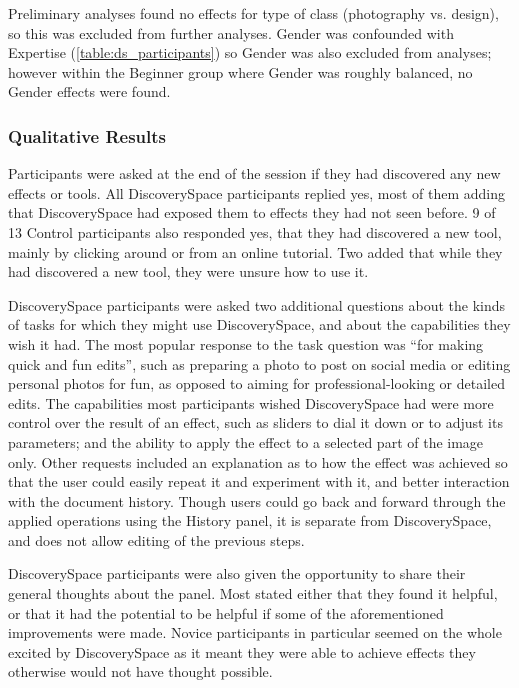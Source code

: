 Preliminary analyses found no effects for type of class (photography vs. design), so this was excluded from further analyses. Gender was confounded with Expertise (\autoref{table:ds_participants}) so Gender was also excluded from analyses; however within the Beginner group where Gender was roughly balanced, no Gender effects were found.

\subsubsection{Qualitative Results}
Participants were asked at the end of the session if they had discovered any new effects or tools. All Discovery\-Space participants replied yes, most of them adding that Discovery\-Space had exposed them to effects they had not seen before. 9 of 13 Control participants also responded yes, that they had discovered a new tool, mainly by clicking around or from an online tutorial. Two added that while they had discovered a new tool, they were unsure how to use it.

Discovery\-Space participants were asked two additional questions about the kinds of tasks for which they might use Discovery\-Space, and about the capabilities they wish it had. The most popular response to the task question was ``for making quick and fun edits'', such as preparing a photo to post on social media or editing personal photos for fun, as opposed to aiming for professional-looking or detailed edits. The capabilities most participants wished Discovery\-Space had were more control over the result of an effect, such as sliders to dial it down or to adjust its parameters; and the ability to apply the effect to a selected part of the image only. Other requests included an explanation as to how the effect was achieved so that the user could easily repeat it and experiment with it, and better interaction with the document history. Though users could go back and forward through the applied operations using the History panel, it is separate from Discovery\-Space, and does not allow editing of the previous steps.

Discovery\-Space participants were also given the opportunity to share their general thoughts about the panel. Most stated either that they found it helpful, or that it had the potential to be helpful if some of the aforementioned improvements were made. Novice participants in particular seemed on the whole excited by Discovery\-Space as it meant they were able to achieve effects they otherwise would not have thought possible.
